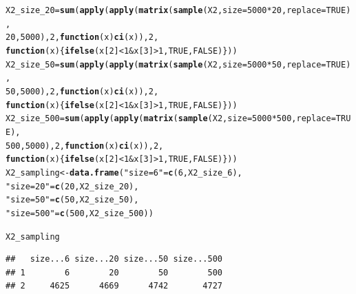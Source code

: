 \documentclass{article}\usepackage[]{graphicx}\usepackage[]{color}
\makeatletter
\newcommand{\hlnum}[1]{\textcolor[rgb]{0.686,0.059,0.569}{#1}}%
\newcommand{\hlstr}[1]{\textcolor[rgb]{0.192,0.494,0.8}{#1}}%
\newcommand{\hlopt}[1]{\textcolor[rgb]{0,0,0}{#1}}%
\newcommand{\hlstd}[1]{\textcolor[rgb]{0.345,0.345,0.345}{#1}}%
\newcommand{\hlkwa}[1]{\textcolor[rgb]{0.161,0.373,0.58}{\textbf{#1}}}%
\newcommand{\hlkwb}[1]{\textcolor[rgb]{0.69,0.353,0.396}{#1}}%
\newcommand{\hlkwc}[1]{\textcolor[rgb]{0.333,0.667,0.333}{#1}}%
\newcommand{\hlkwd}[1]{\textcolor[rgb]{0.737,0.353,0.396}{\textbf{#1}}}%
\newenvironment{kframe}{%
 \def\at@end@of@kframe{}%
 \ifinner\ifhmode%
  \def\at@end@of@kframe{\end{minipage}}%
  \begin{minipage}{\columnwidth}%
 \fi\fi%
 \def\FrameCommand##1{\hskip\@totalleftmargin \hskip-\fboxsep
 \colorbox{shadecolor}{##1}\hskip-\fboxsep
     \hskip-\linewidth \hskip-\@totalleftmargin \hskip\columnwidth}%
 \MakeFramed {\advance\hsize-\width
   \@totalleftmargin\z@ \linewidth\hsize
   \@setminipage}}%
 {\par\unskip\endMakeFramed%
 \at@end@of@kframe}
\newenvironment{knitrout}{}{} %
\makeatother
\begin{document}
\begin{knitrout}
\begin{kframe}
\begin{alltt}
\hlstd{X2_size_20} \hlkwb{=} \hlkwd{sum}\hlstd{(}\hlkwd{apply}\hlstd{(}\hlkwd{apply}\hlstd{(}\hlkwd{matrix}\hlstd{(}\hlkwd{sample}\hlstd{(X2,} \hlkwc{size} \hlstd{=} \hlnum{5000} \hlopt{*}\hlnum{20}\hlstd{,} \hlkwc{replace} \hlstd{=} \hlnum{TRUE}\hlstd{),}
                                   \hlnum{20}\hlstd{,}\hlnum{5000}\hlstd{),} \hlnum{2}\hlstd{,} \hlkwa{function}\hlstd{(}\hlkwc{x}\hlstd{)} \hlkwd{ci}\hlstd{(x)),} \hlnum{2}\hlstd{,}
                      \hlkwa{function}\hlstd{(}\hlkwc{x}\hlstd{)\{}\hlkwd{ifelse}\hlstd{(x[}\hlnum{2}\hlstd{]} \hlopt{<} \hlnum{1} \hlopt{&} \hlstd{x[}\hlnum{3}\hlstd{]} \hlopt{>} \hlnum{1}\hlstd{,} \hlnum{TRUE}\hlstd{,} \hlnum{FALSE}\hlstd{)\}))}
\hlstd{X2_size_50} \hlkwb{=} \hlkwd{sum}\hlstd{(}\hlkwd{apply}\hlstd{(}\hlkwd{apply}\hlstd{(}\hlkwd{matrix}\hlstd{(}\hlkwd{sample}\hlstd{(X2,} \hlkwc{size} \hlstd{=} \hlnum{5000} \hlopt{*}\hlnum{50}\hlstd{,} \hlkwc{replace} \hlstd{=} \hlnum{TRUE}\hlstd{),}
                                   \hlnum{50}\hlstd{,}\hlnum{5000}\hlstd{),} \hlnum{2}\hlstd{,} \hlkwa{function}\hlstd{(}\hlkwc{x}\hlstd{)} \hlkwd{ci}\hlstd{(x)),} \hlnum{2}\hlstd{,}
                      \hlkwa{function}\hlstd{(}\hlkwc{x}\hlstd{)\{}\hlkwd{ifelse}\hlstd{(x[}\hlnum{2}\hlstd{]} \hlopt{<} \hlnum{1} \hlopt{&} \hlstd{x[}\hlnum{3}\hlstd{]} \hlopt{>} \hlnum{1}\hlstd{,} \hlnum{TRUE}\hlstd{,} \hlnum{FALSE}\hlstd{)\}))}
\hlstd{X2_size_500} \hlkwb{=} \hlkwd{sum}\hlstd{(}\hlkwd{apply}\hlstd{(}\hlkwd{apply}\hlstd{(}\hlkwd{matrix}\hlstd{(}\hlkwd{sample}\hlstd{(X2,} \hlkwc{size} \hlstd{=} \hlnum{5000} \hlopt{*}\hlnum{500}\hlstd{,} \hlkwc{replace} \hlstd{=} \hlnum{TRUE}\hlstd{),}
                                   \hlnum{500}\hlstd{,}\hlnum{5000}\hlstd{),} \hlnum{2}\hlstd{,} \hlkwa{function}\hlstd{(}\hlkwc{x}\hlstd{)} \hlkwd{ci}\hlstd{(x)),} \hlnum{2}\hlstd{,}
                      \hlkwa{function}\hlstd{(}\hlkwc{x}\hlstd{)\{}\hlkwd{ifelse}\hlstd{(x[}\hlnum{2}\hlstd{]} \hlopt{<} \hlnum{1} \hlopt{&} \hlstd{x[}\hlnum{3}\hlstd{]} \hlopt{>} \hlnum{1}\hlstd{,} \hlnum{TRUE}\hlstd{,} \hlnum{FALSE}\hlstd{)\}))}
\hlstd{X2_sampling} \hlkwb{<-} \hlkwd{data.frame}\hlstd{(}\hlstr{"size = 6"} \hlstd{=} \hlkwd{c}\hlstd{(}\hlnum{6}\hlstd{, X2_size_6),}
                          \hlstr{"size = 20"} \hlstd{=} \hlkwd{c}\hlstd{(}\hlnum{20}\hlstd{, X2_size_20),}
                          \hlstr{"size = 50"} \hlstd{=} \hlkwd{c}\hlstd{(}\hlnum{50}\hlstd{, X2_size_50),}
                          \hlstr{"size = 500"} \hlstd{=} \hlkwd{c}\hlstd{(}\hlnum{500}\hlstd{, X2_size_500))}

\hlstd{X2_sampling}
\end{alltt}
\begin{verbatim}
##   size...6 size...20 size...50 size...500
## 1        6        20        50        500
## 2     4625      4669      4742       4727
\end{verbatim}
\end{kframe}
\end{knitrout}
\end{document}
